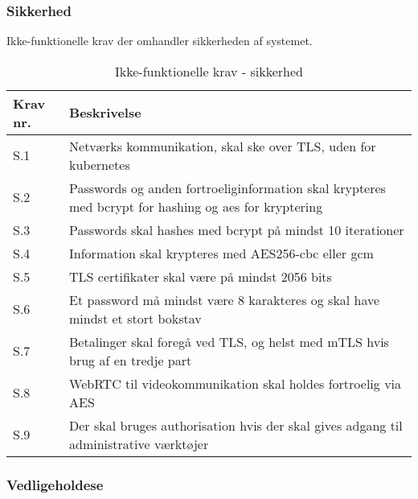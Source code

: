 \subsubsection{Sikkerhed}

Ikke-funktionelle krav der omhandler sikkerheden af systemet.

\begin{table}[H]
    \centering
    \caption{Ikke-funktionelle krav - sikkerhed}
    \label{tab:if-security}
    \begin{tabular}{l|l}
        \textbf{Krav nr.} & \textbf{Beskrivelse}                                                                                                               \\\hline
        S.1               & \multicolumn{1}{p{8cm}}{Netværks kommunikation, skal ske over TLS, uden for kubernetes} \\\hline
        S.2               & \multicolumn{1}{p{8cm}}{Passwords og anden fortroeliginformation skal krypteres med bcrypt for hashing og aes for kryptering} \\\hline
        S.3               & \multicolumn{1}{p{8cm}}{Passwords skal hashes med bcrypt på mindst 10 iterationer} \\\hline
        S.4               & \multicolumn{1}{p{8cm}}{Information skal krypteres med AES256-cbc eller gcm} \\\hline
        S.5               & \multicolumn{1}{p{8cm}}{TLS certifikater skal være på mindst 2056 bits} \\\hline
        S.6               & \multicolumn{1}{p{8cm}}{Et password må mindst være 8 karakteres og skal have mindst et stort bokstav} \\\hline
        S.7               & \multicolumn{1}{p{8cm}}{Betalinger skal foregå ved TLS, og helst med mTLS hvis brug af en tredje part} \\\hline
        S.8               & \multicolumn{1}{p{8cm}}{WebRTC til videokommunikation skal holdes fortroelig via AES} \\\hline
        S.9               & \multicolumn{1}{p{8cm}}{Der skal bruges authorisation hvis der skal gives adgang til administrative værktøjer} \\\hline
    \end{tabular}
\end{table}

\subsubsection{Vedligeholdese}

